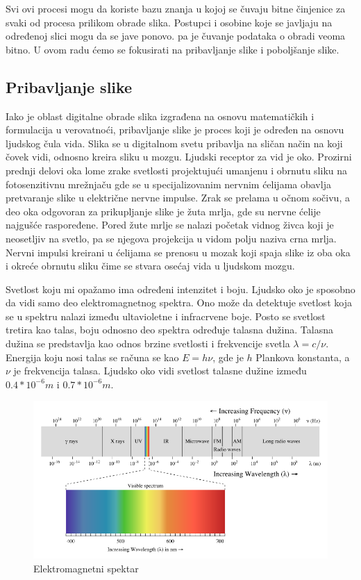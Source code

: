 \documentclass[a4paper,12pt,titlepage]{article}
\begin{document}
Svi ovi procesi mogu da koriste bazu znanja u kojoj se čuvaju bitne činjenice za svaki od procesa prilikom obrade slika. Postupci i osobine koje se javljaju na određenoj slici mogu da se jave ponovo. pa je čuvanje podataka o obradi veoma bitno. U ovom radu ćemo se fokusirati na pribavljanje slike i poboljšanje slike.

\subsection{Pribavljanje slike}%

Iako je oblast digitalne obrade slika izgrađena na osnovu matematičkih i formulacija u verovatnoći, pribavljanje slike je proces koji je određen na osnovu ljudskog čula vida. Slika se u digitalnom svetu pribavlja na sličan način na koji čovek vidi, odnosno kreira sliku u mozgu. Ljudski receptor za vid je oko. Prozirni prednji delovi oka lome zrake svetlosti projektujući umanjenu i obrnutu sliku na fotosenzitivnu mrežnjaču gde se u specijalizovanim nervnim ćelijama obavlja pretvaranje slike u električne nervne impulse. Zrak se prelama u očnom sočivu, a deo oka odgovoran za prikupljanje slike je žuta mrlja, gde su nervne ćelije najgušće raspoređene. Pored žute mrlje se nalazi početak vidnog živca koji je neosetljiv na svetlo, pa se njegova projekcija u vidom polju naziva crna mrlja. Nervni impulsi kreirani u ćelijama se prenosu u mozak koji spaja slike iz oba oka i okreće obrnutu sliku čime se stvara osećaj vida u ljudskom mozgu.

Svetlost koju mi opažamo ima određeni intenzitet i boju. Ljudsko oko je sposobno da vidi samo deo elektromagnetnog spektra. Ono može da detektuje svetlost koja se u spektru nalazi između ultavioletne i infracrvene boje. Posto se svetlost tretira kao talas, boju odnosno deo spektra određuje talasna dužina. Talasna dužina se predstavlja kao odnos brzine svetlosti i frekvencije svetla $\lambda = c / \nu$. Energija koju nosi talas se računa se kao $E = h \nu$, gde je $h$ Plankova konstanta, a $\nu$ je frekvencija talasa. Ljudsko oko vidi svetlost talasne dužine između $0.4 * 10^{-6}m$ i $0.7 * 10^{-6}m$.

\begin{figure}[ht!]
\centering
\includegraphics[width=120mm]{img/spektar.png}
\caption{Elektromagnetni spektar}
\label{spektar}
\end{figure} 
\end{document}
